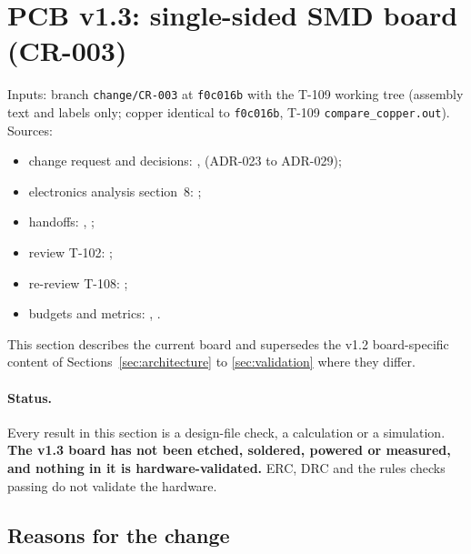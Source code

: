 \section{PCB v1.3: single-sided SMD board (CR-003)}
\label{sec:cr003}

Inputs: branch \texttt{change/CR-003} at \texttt{f0c016b} with the T-109 working tree (assembly text and labels only; copper identical to \texttt{f0c016b}, T-109 \nolinkurl{compare_copper.out}). Sources:
\begin{itemize}[noitemsep]
  \item change request and decisions: ,
         (ADR-023 to ADR-029);
  \item electronics analysis section~8: ;
  \item handoffs: ,
        ;
  \item review T-102: ;
  \item re-review T-108: ;
  \item budgets and metrics: ,
        .
\end{itemize}
This section describes the current board and supersedes the v1.2
board-specific content of Sections~\ref{sec:architecture} to \ref{sec:validation}
where they differ.

\paragraph{Status.} Every result in this section is a design-file check, a
calculation or a simulation. \textbf{The v1.3 board has not been etched, soldered,
powered or measured, and nothing in it is hardware-validated.} ERC, DRC and the
rules checks passing do not validate the hardware.

\subsection{Reasons for the change}

